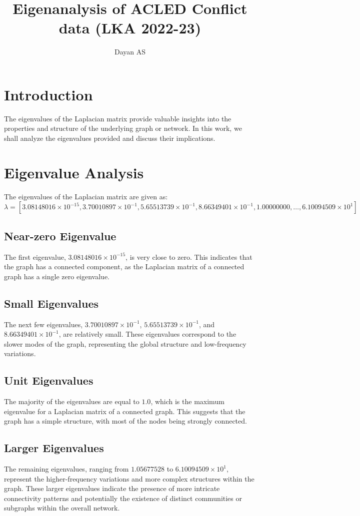 \documentclass{article}
\title{Eigenanalysis of ACLED Conflict data (LKA 2022-23)}
\author{Dayan AS}
\begin{document}
\maketitle

\section{Introduction}
The eigenvalues of the Laplacian matrix provide valuable insights into the properties and structure of the underlying graph or network. In this work, we shall analyze the eigenvalues provided and discuss their implications.

\section{Eigenvalue Analysis}
The eigenvalues of the Laplacian matrix are given as:
\[
\lambda = \left[3.08148016\times 10^{-15}, 3.70010897\times 10^{-1}, 5.65513739\times 10^{-1}, 8.66349401\times 10^{-1}, 1.00000000, \dots, 6.10094509\times 10^{1}\right]
\]

\subsection{Near-zero Eigenvalue}
The first eigenvalue, $3.08148016\times 10^{-15}$, is very close to zero. This indicates that the graph has a connected component, as the Laplacian matrix of a connected graph has a single zero eigenvalue.

\subsection{Small Eigenvalues}
The next few eigenvalues, $3.70010897\times 10^{-1}$, $5.65513739\times 10^{-1}$, and $8.66349401\times 10^{-1}$, are relatively small. These eigenvalues correspond to the slower modes of the graph, representing the global structure and low-frequency variations.

\subsection{Unit Eigenvalues}
The majority of the eigenvalues are equal to $1.0$, which is the maximum eigenvalue for a Laplacian matrix of a connected graph. This suggests that the graph has a simple structure, with most of the nodes being strongly connected.

\subsection{Larger Eigenvalues}
The remaining eigenvalues, ranging from $1.05677528$ to $6.10094509\times 10^{1}$, represent the higher-frequency variations and more complex structures within the graph. These larger eigenvalues indicate the presence of more intricate connectivity patterns and potentially the existence of distinct communities or subgraphs within the overall network.
\end{document}
